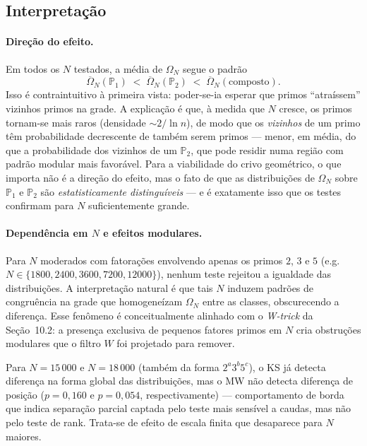 \documentclass[12pt,a4paper]{article}
\theoremstyle{remark}
\begin{document}
	\subsection{Interpretação}
	
	\paragraph{Direção do efeito.}
	Em todos os $N$ testados, a média de $\Omega_N$ segue o padrão
	\[
	\overline{\Omega}_N(\mathbb{P}_1)
	\;<\; \overline{\Omega}_N(\mathbb{P}_2)
	\;<\; \overline{\Omega}_N(\text{composto}).
	\]
	Isso é contraintuitivo à primeira vista: poder-se-ia esperar que primos
	``atraíssem'' vizinhos primos na grade. A explicação é que, à medida que
	$N$ cresce, os primos tornam-se mais raros (densidade $\sim 2/\!\ln n$),
	de modo que os \emph{vizinhos} de um primo têm probabilidade decrescente
	de também serem primos — menor, em média, do que a probabilidade dos
	vizinhos de um $\mathbb{P}_2$, que pode residir numa região com padrão
	modular mais favorável. Para a viabilidade do crivo geométrico, o que importa
	não é a direção do efeito, mas o fato de que as distribuições de $\Omega_N$
	sobre $\mathbb{P}_1$ e $\mathbb{P}_2$ são \emph{estatisticamente distinguíveis}
	— e é exatamente isso que os testes confirmam para $N$ suficientemente grande.
	
	\paragraph{Dependência em $N$ e efeitos modulares.}
	Para $N$ moderados com fatorações envolvendo apenas os primos $2$, $3$ e $5$
	(e.g.\ $N \in \{1800, 2400, 3600, 7200, 12000\}$), nenhum teste rejeitou a
	igualdade das distribuições. A interpretação natural é que tais $N$ induzem
	padrões de congruência na grade que homogeneízam $\Omega_N$ entre as classes,
	obscurecendo a diferença. Esse fenômeno é conceitualmente alinhado com o
	\emph{W-trick} da Seção~10.2: a presença exclusiva de pequenos fatores primos
	em $N$ cria obstruções modulares que o filtro $W$ foi projetado para remover.
	
	Para $N = 15\,000$ e $N = 18\,000$ (também da forma $2^a3^b5^c$), o KS já
	detecta diferença na forma global das distribuições, mas o MW não detecta
	diferença de posição ($p = 0{,}160$ e $p = 0{,}054$, respectivamente) —
	comportamento de borda que indica separação parcial captada pelo teste mais
	sensível a caudas, mas não pelo teste de rank. Trata-se de efeito de escala
	finita que desaparece para $N$ maiores.
	
\end{document}
